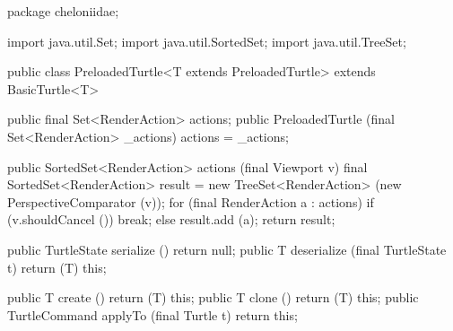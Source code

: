 \documentclass{report}
\begin{document}
\begin{javacode}
package cheloniidae;

import java.util.Set;
import java.util.SortedSet;
import java.util.TreeSet;

public class PreloadedTurtle<T extends PreloadedTurtle> extends BasicTurtle<T> {
  public final Set<RenderAction> actions;
  public PreloadedTurtle (final Set<RenderAction> _actions) {actions = _actions;}

  public SortedSet<RenderAction> actions (final Viewport v) {
    final SortedSet<RenderAction> result = new TreeSet<RenderAction> (new PerspectiveComparator (v));
    for (final RenderAction a : actions) if (v.shouldCancel ()) break;
                                         else                   result.add (a);
    return result;
  }

  public TurtleState serialize   ()                    {return null;}
  public T           deserialize (final TurtleState t) {return (T) this;}

  public T             create  ()               {return (T) this;}
  public T             clone   ()               {return (T) this;}
  public TurtleCommand applyTo (final Turtle t) {return this;}
}
\end{javacode}
\end{document}

